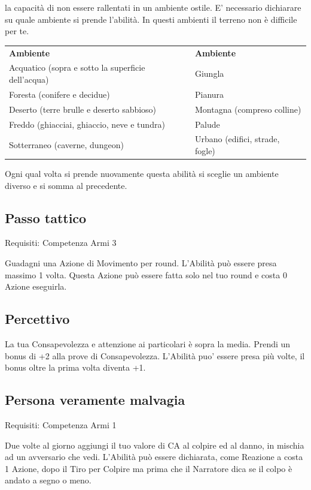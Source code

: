 \documentclass[a4paper,11pt,twoside,openany]{book}
\begin{document}
la capacità di non essere rallentati in un ambiente ostile. E' necessario dichiarare su quale ambiente si prende l'abilità. In questi ambienti il terreno non è difficile per te.

\bigskip

\begin{tabular}{ll}
	\toprule
	\textbf{Ambiente}                                  & \textbf{Ambiente}\tabularnewline
	Acquatico (sopra e sotto la superficie dell'acqua) & Giungla\tabularnewline
	Foresta (conifere e decidue)                       & Pianura\tabularnewline
	Deserto (terre brulle e deserto sabbioso)          & Montagna (compreso colline)\tabularnewline
	Freddo (ghiacciai, ghiaccio, neve e tundra)        & Palude\tabularnewline
	Sotterraneo (caverne, dungeon)                     & Urbano (edifici, strade, fogle)\tabularnewline
\end{tabular}

\bigskip

Ogni qual volta si prende nuovamente questa abilità si sceglie un
ambiente diverso e si somma al precedente.

\subsection{Passo tattico}

Requisiti: Competenza Armi 3

Guadagni una Azione di Movimento per round. L'Abilità può essere presa massimo 1 volta. Questa Azione può essere fatta solo nel tuo round e costa 0 Azione eseguirla.

\subsection{Percettivo}

La tua Consapevolezza e attenzione ai particolari è sopra la media.
Prendi un bonus di +2 alla prove di Consapevolezza. L'Abilità puo'
essere presa più volte, il bonus oltre la prima volta diventa +1.

\subsection{Persona veramente malvagia}

Requisiti: Competenza Armi 1

Due volte al giorno aggiungi il tuo valore di CA al colpire ed al danno, in mischia ad un avversario che vedi. L'Abilità può essere dichiarata, come Reazione a costa 1 Azione, dopo il Tiro per Colpire ma prima che il Narratore dica se il colpo è andato a segno o meno.
\end{document}
